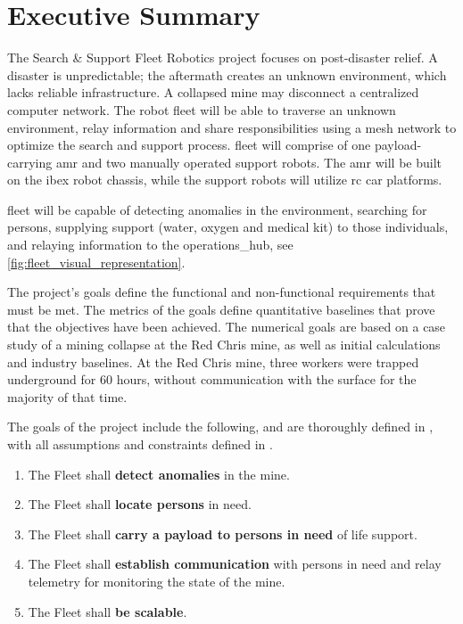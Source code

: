 
\section{Executive Summary}
\label{sec:executive_summary}

The Search \& Support Fleet Robotics project focuses on post-disaster relief. A disaster is unpredictable; the aftermath creates an unknown environment, which lacks reliable infrastructure. A collapsed mine may disconnect a centralized computer network. The robot fleet will be able to traverse an unknown environment, relay information and share responsibilities using a mesh network to optimize the search and support process. \gls{fleet} will comprise of one payload-carrying \gls{amr} and two manually operated support robots. The \gls{amr} will be built on the \gls{ibex} robot chassis, while the support robots will utilize \gls{rc} car platforms. 

\gls{fleet} will be capable of detecting \gls{anomalies} in the environment, searching for \gls{persons}, supplying support (water, oxygen and medical kit) to those individuals, and relaying information to the \gls{operations_hub}, see \autoref{fig:fleet_visual_representation}. 

The project's goals define the functional and non-functional requirements that must be met. The metrics of the goals define quantitative baselines that prove that the objectives have been achieved. The numerical goals are based on a case study of a mining collapse at the Red Chris mine, as well as initial calculations and industry baselines. At the Red Chris mine, three workers were trapped underground for 60 hours, without communication with the surface for the majority of that time.

The goals of the project include the following, and are thoroughly defined in , with all assumptions and constraints defined in .

\begin{enumerate}
    \item The Fleet shall \textbf{detect \gls{anomalies}} in the mine.
    \item The Fleet shall \textbf{locate \gls{persons}} in need.
    \item The Fleet shall \textbf{carry a \gls{payload} to persons in need} of life support.
    \item The Fleet shall \textbf{establish communication} with persons in need and relay telemetry for monitoring the state of the mine.
    \item The Fleet shall \textbf{be scalable}.
\end{enumerate}

